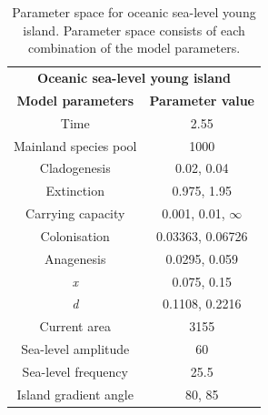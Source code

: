 \begin{table}[ht]
    \centering
    \caption{Parameter space for oceanic sea-level young island. Parameter space consists of each combination of the model parameters.}
    \begin{tabular}{ c | c }
        \multicolumn{2}{c}{\textbf{Oceanic sea-level young island}} \\
        \textbf{Model parameters} & \textbf{Parameter value} \\ 
        \hline
        \hline
        Time & 2.55 \\
        \hline
        Mainland species pool & 1000 \\
        \hline
        Cladogenesis & 0.02, 0.04 \\
        \hline
        Extinction & 0.975, 1.95 \\
        \hline
        Carrying capacity & 0.001, 0.01, $\infty$ \\
        \hline
        Colonisation & 0.03363, 0.06726 \\
        \hline
        Anagenesis & 0.0295, 0.059 \\
        \hline
        \textit{x} & 0.075, 0.15 \\
        \hline
        \textit{d} & 0.1108, 0.2216 \\
        \hline
        Current area & 3155 \\
        \hline
        Sea-level amplitude & 60 \\
        \hline
        Sea-level frequency & 25.5 \\
        \hline
        Island gradient angle & 80, 85 \\
    \end{tabular}
    \label{tab:oceanic_sea_level_young}
\end{table}

